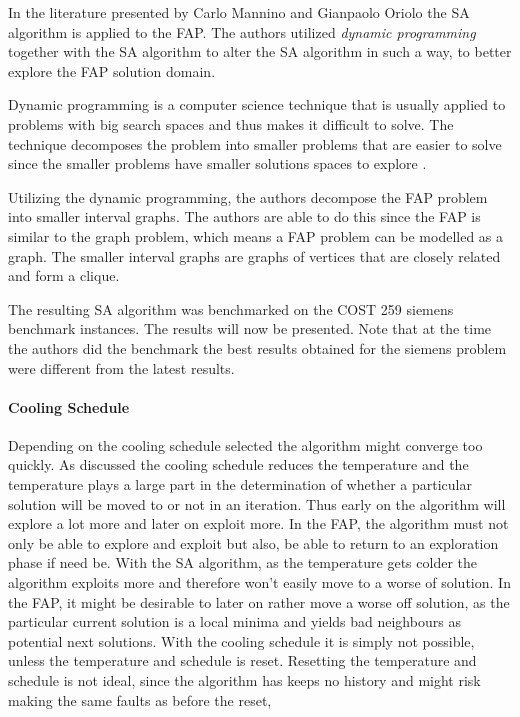 In the literature presented by Carlo Mannino and Gianpaolo Oriolo\cite{SolvingSuperIntervalGraphs} the SA algorithm is applied to the FAP. The authors utilized \emph{dynamic programming} together with the SA algorithm to alter the SA algorithm in such a way, to better explore the FAP solution domain.

Dynamic programming is a computer science technique that is usually applied to problems with big search spaces and thus makes it difficult to solve\cite{AIModernApproach}. The technique decomposes the problem into smaller problems that are easier to solve since the smaller problems have smaller solutions spaces to explore \cite{AIModernApproach,IntroMathProgramming}.

Utilizing the dynamic programming, the authors decompose the FAP problem into smaller interval graphs. The authors are able to do this since the FAP is similar to the graph problem, which means a FAP problem can be modelled as a graph\cite{ProblemDecompMIFAP}. The smaller interval graphs are graphs of vertices that are closely related and form a clique\cite{ProblemDecompMIFAP}.

The resulting SA algorithm was benchmarked on the COST 259 siemens benchmark instances. The results will now be presented. Note that at the time the authors did the benchmark the best results obtained for the siemens problem were different from the latest results.
\paragraph{Cooling Schedule}
Depending on the cooling schedule selected the algorithm might converge too quickly. As discussed the cooling schedule reduces the temperature and the temperature plays a large part in the determination of whether a particular solution will be moved to or not in an iteration. Thus early on the algorithm will explore a lot more and later on exploit more. In the FAP, the algorithm must not only be able to explore and exploit but also, be able to return to an exploration phase if need be.
With the SA algorithm, as the temperature gets colder the algorithm exploits more and therefore won't easily move to a worse of solution. In the FAP, it might be desirable to later on rather move a worse off solution, as the particular current solution is a local minima and yields bad neighbours as potential next solutions. With the cooling schedule it is simply not possible, unless the temperature and schedule is reset. Resetting the temperature and schedule is not ideal, since the algorithm has keeps no history and might risk making the same faults as before the reset,
